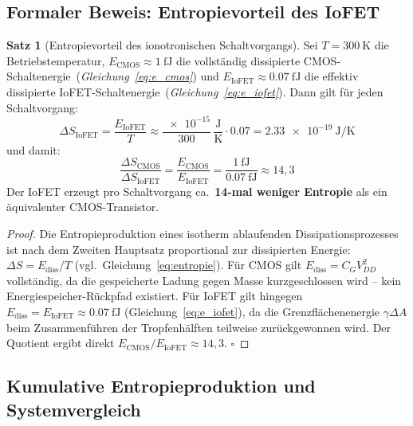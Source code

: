 ﻿\documentclass[12pt, a4paper]{report}
\theoremstyle{definition}
\newtheorem{theorem}{Satz}[section]
\theoremstyle{remark}
\begin{document}
\subsection{Formaler Beweis: Entropievorteil des IoFET}

\begin{theorem}[Entropievorteil des ionotronischen Schaltvorgangs]
  \label{thm:entropie_iofet}
  Sei $T = \SI{300}{\kelvin}$ die Betriebstemperatur,
  $E_\text{CMOS} \approx \SI{1}{\femto\joule}$ die vollständig dissipierte
  CMOS-Schaltenergie~\textup{(}\emph{Gleichung~\eqref{eq:e_cmos}}\textup{)}
  und $E_\text{IoFET} \approx \SI{0.07}{\femto\joule}$ die effektiv
  dissipierte IoFET-Schaltenergie~\textup{(}\emph{Gleichung~\eqref{eq:e_iofet}}\textup{)}.
  Dann gilt für jeden Schaltvorgang:
  \begin{equation}
    \Delta S_\text{IoFET} = \frac{E_\text{IoFET}}{T}
    \approx \frac{\num{e-15}}{300}\,\frac{\mathrm{J}}{\mathrm{K}}
    \cdot 0.07
    = \SI{2.33e-19}{\joule\per\kelvin}
    \label{eq:ds_iofet}
  \end{equation}
  und damit:
  \begin{equation}
    \frac{\Delta S_\text{CMOS}}{\Delta S_\text{IoFET}}
    = \frac{E_\text{CMOS}}{E_\text{IoFET}}
    = \frac{\SI{1}{\femto\joule}}{\SI{0.07}{\femto\joule}}
    \approx 14{,}3
    \label{eq:entropie_ratio}
  \end{equation}
  Der IoFET erzeugt pro Schaltvorgang ca.\ \textbf{14-mal weniger Entropie}
  als ein äquivalenter CMOS-Transistor.
\end{theorem}

\begin{proof}
  Die Entropieproduktion eines isotherm ablaufenden Dissipationsprozesses
  ist nach dem Zweiten Hauptsatz proportional zur dissipierten Energie:
  $\Delta S = E_\text{diss} / T$ (vgl.\ Gleichung~\eqref{eq:entropie}).
  Für CMOS gilt $E_\text{diss} = C_G V_{DD}^2$ vollständig, da die gespeicherte
  Ladung gegen Masse kurzgeschlossen wird -- kein Energiespeicher-Rückpfad
  existiert. Für IoFET gilt hingegen
  $E_\text{diss} = E_\text{IoFET} \approx \SI{0.07}{\femto\joule}$
  (Gleichung~\eqref{eq:e_iofet}), da die Grenzflächenenergie $\gamma \Delta A$
  beim Zusammenführen der Tropfenhälften teilweise zurückgewonnen wird.
  Der Quotient ergibt direkt $E_\text{CMOS} / E_\text{IoFET} \approx 14{,}3$.
  $\square$
\end{proof}

\subsection{Kumulative Entropieproduktion und Systemvergleich}
\end{document}
